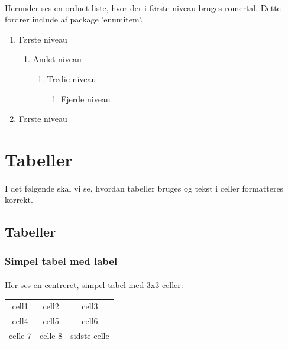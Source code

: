 \documentclass{article}
\begin{document}
\paragraph{}
Herunder ses en ordnet liste, hvor der i første niveau bruges romertal. Dette fordrer include af package 'enumitem'.
\begin{enumerate}[label=\Roman*]
    \item Første niveau
    \begin{enumerate}
        \item Andet niveau
        \begin{enumerate}
            \item Tredie niveau
            \begin{enumerate}
                \item Fjerde niveau
            \end{enumerate}
        \end{enumerate}
    \end{enumerate}
    \item Første niveau
\end{enumerate}
\section{Tabeller}
\paragraph{}
I det følgende skal vi se, hvordan tabeller bruges og tekst i celler formatteres korrekt.
\subsection{Tabeller}
\subsubsection{Simpel tabel med label}
\paragraph{}
Her ses en centreret, simpel tabel med 3x3 celler:
\begin{center}
\begin{tabular}{ c c c }
    cell1 & cell2 & cell3 \\
    cell4 & cell5 & cell6 \\
    celle 7 & celle 8 & sidste celle
\end{tabular}
\end{center}
\end{document}
